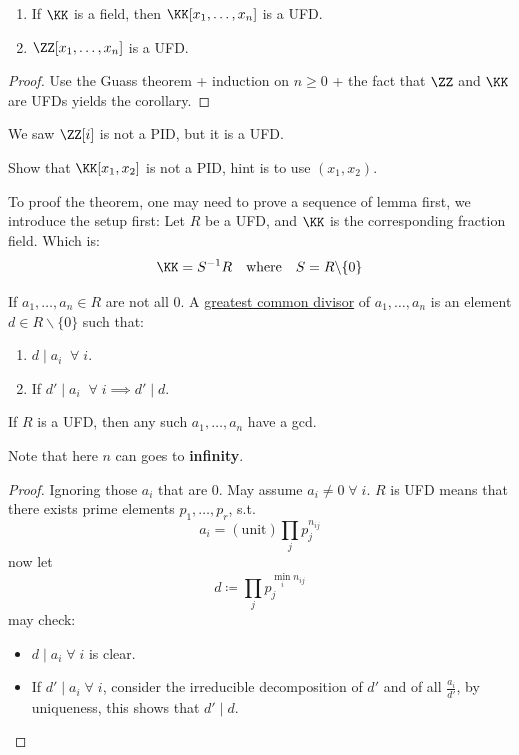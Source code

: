 \begin{corollary}
	\leavevmode
	\begin{enumerate}
		\item If \( \KK \) is a field, then \( \KK[x_1,\ldots, x_n] \) is a UFD.
		\item \( \ZZ[x_1,\ldots, x_n] \) is a UFD.
	\end{enumerate}
\end{corollary}

\begin{proof}
	Use the Guass theorem + induction on \( n\geq 0 \) + the fact that \( \ZZ \) and \( \KK \) are
	UFDs yields the corollary.
\end{proof}

\begin{remark}
	We saw \( \ZZ[i] \) is not a PID, but it is a UFD.
\end{remark}

\begin{exercise}
	Show that \( \KK[x_1,x_2] \) is not a PID, hint is to use \( (x_1,x_2) \).
\end{exercise}
To proof the theorem, one may need to prove a sequence of lemma first, we introduce the setup first:
Let \( R \) be a UFD, and \( \KK \) is the corresponding fraction field. Which is:
\[
	\KK = S^{-1} R \quad \text{where} \quad S = R\backslash \{0\}
\]

\begin{definition}
	If \( a_1,\ldots, a_n \in R \) are not all \( 0 \). A \underline{greatest common divisor} of \(
	a_1,\ldots, a_n \) is an element \( d\in R\backslash \{0\} \) such that:
	\begin{enumerate}
		\item \( d \mid a_i \; \; \forall \; i\).
		\item If \( d' \mid a_i \; \; \forall \; i \implies d' \mid d \).
	\end{enumerate}
\end{definition}

\begin{lemma}
	\label{lem:gcd-exists}
	If \( R \) is a UFD, then any such \( a_1,\ldots, a_n \) have a gcd.
	\begin{note}
		Note that here \( n \) can goes to \textbf{infinity}.
	\end{note}
\end{lemma}

\begin{proof}
	Ignoring those \( a_i \) that are \( 0 \). May assume \( a_i \ne 0 \; \forall \; i \). \( R \) is
	UFD means that there exists prime elements \( p_1,\ldots, p_r \), s.t.
	\[
		a_i = (\text{unit}) \prod_{j} p_j^{n_{ij}}
	\]
	now let
	\[
		d \coloneqq  \prod_{j} p_j^{\min_i n_{ij}}
	\]
	may check:
	\begin{itemize}
		\item \( d\mid a_i \; \forall \; i \) is clear.
		\item If \( d'\mid a_i \; \forall \; i \), consider the irreducible decomposition of \( d' \)
		      and of all \( \frac{a_i}{d'} \), by uniqueness, this shows that \( d' \mid d \).
	\end{itemize}
\end{proof}


